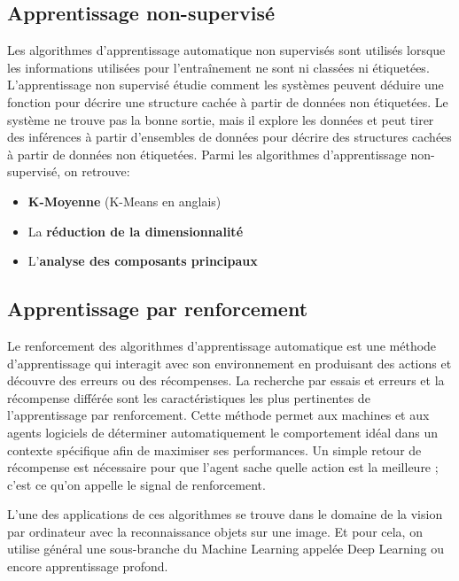     \subsection{Apprentissage non-supervisé}
    Les algorithmes d'apprentissage automatique non supervisés sont utilisés lorsque les informations utilisées pour l'entraînement ne sont ni classées ni étiquetées. L'apprentissage non supervisé étudie comment les systèmes peuvent déduire une fonction pour décrire une structure cachée à partir de données non étiquetées. Le système ne trouve pas la bonne sortie, mais il explore les données et peut tirer des inférences à partir d'ensembles de données pour décrire des structures cachées à partir de données non étiquetées.\cite{expertAi}
    Parmi les algorithmes d'apprentissage non-supervisé, on retrouve:
        \begin{itemize}
            \item \textbf{K-Moyenne} (K-Means en anglais)
            \item La \textbf{réduction de la dimensionnalité}
            \item L'\textbf{analyse des composants principaux}
        \end{itemize}

    \subsection{Apprentissage par renforcement}
    Le renforcement des algorithmes d'apprentissage automatique est une méthode d'apprentissage qui interagit avec son environnement en produisant des actions et découvre des erreurs ou des récompenses. La recherche par essais et erreurs et la récompense différée sont les caractéristiques les plus pertinentes de l'apprentissage par renforcement. Cette méthode permet aux machines et aux agents logiciels de déterminer automatiquement le comportement idéal dans un contexte spécifique afin de maximiser ses performances. Un simple retour de récompense est nécessaire pour que l'agent sache quelle action est la meilleure ; c'est ce qu'on appelle le signal de renforcement.\cite{expertAi}




L’une des applications de ces algorithmes se trouve dans le domaine de la vision par ordinateur avec la reconnaissance objets sur une image. Et pour cela, on utilise général une sous-branche du Machine Learning appelée Deep Learning ou encore apprentissage profond.
